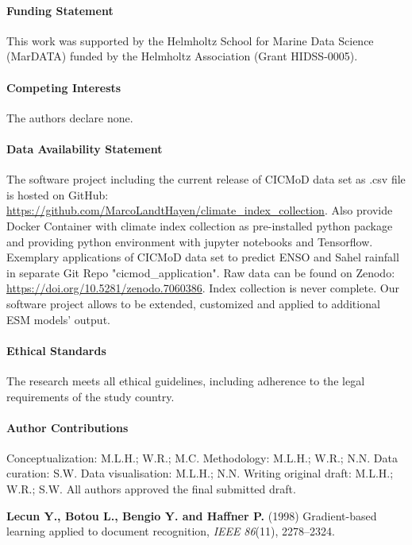 \documentclass{CUP-JNL-DTM}%
\theoremstyle{definition}
\numberwithin{equation}{section}
\begin{document}
\begin{Backmatter}

\paragraph{Funding Statement}
This work was supported by the Helmholtz School for Marine Data Science (MarDATA) funded by the Helmholtz Association (Grant HIDSS-0005).

\paragraph{Competing Interests}
The authors declare none.

\paragraph{Data Availability Statement}
The software project including the current release of CICMoD data set as .csv file is hosted on GitHub: \url{https://github.com/MarcoLandtHayen/climate_index_collection}. Also provide Docker Container with climate index collection as pre-installed python package and providing python environment with jupyter notebooks and Tensorflow. Exemplary applications of CICMoD data set to predict ENSO and Sahel rainfall in separate Git Repo "cicmod_application". Raw data can be found on Zenodo: \url{https://doi.org/10.5281/zenodo.7060386}.
Index collection is never complete. Our software project allows to be extended, customized and applied to additional ESM models' output.

\paragraph{Ethical Standards}
The research meets all ethical guidelines, including adherence to the legal requirements of the study country.

\paragraph{Author Contributions}
Conceptualization: M.L.H.; W.R.; M.C. Methodology: M.L.H.; W.R.; N.N. Data curation: S.W. Data visualisation: M.L.H.; N.N. Writing original draft: M.L.H.; W.R.; S.W. All authors approved the final submitted draft.

\begin{thebibliography}{}
\textbf{Lecun Y., Botou L., Bengio Y. and Haffner P.} (1998) Gradient-based learning applied to document recognition, \textit{IEEE} \textit{86}(11), {2278}--{2324}.


\end{thebibliography}
\end{Backmatter}
\end{document}
